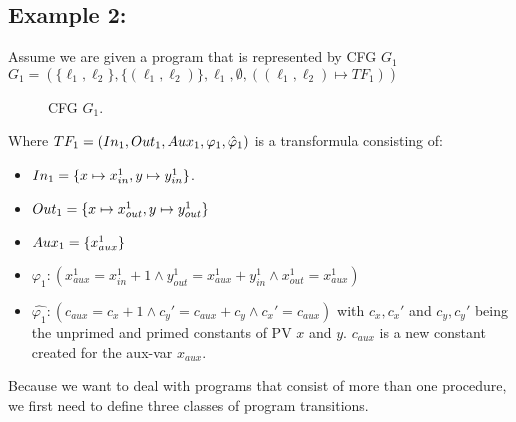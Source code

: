 \documentclass{article}
\newcommand\mycom[1]{}
\newcommand\mycom[1]{#1}
\newcommand{\jw}[1]{\mycom{\todo[color=blue!40,inline]{\small JW: #1}}}
\begin{document}
	\subsection*{Example 2:}
	Assume we are given a program that is represented by CFG $G_1$ \\ $G_1 = (\{ \ell_1, \ell_2 \}, \{ (\ell_1, \ell_2)\}, \ell_1, \emptyset, ((\ell_1, \ell_2) 
	\mapsto TF_1))$
	\begin{figure}[H]
		\centering
		\caption{CFG $G_1$.}
	\end{figure}

	Where $TF_1 = (In_1, Out_1, Aux_1, \varphi_1, \hat{\varphi}_1)$ is a transformula consisting of: 
	\begin{itemize}
		\item $In_1 = \{x \mapsto x_{in}^1, y \mapsto y_{in}^1 \}$.
		\item $Out_1 = \{ x \mapsto x_{out}^1, y \mapsto y_{out}^1 \}$
		\item $Aux_1 = \{x_{aux}^1 \} $
		\item $\varphi_1: (x_{aux}^1 = x_{in}^1 + 1 \land y_{out}^1 = x_{aux}^1 + y_{in}^1 \land x_{out}^1 = x_{aux}^1)$
		\item $\hat{\varphi_1}: (c_{aux} = c_x + 1 \land c_y' = c_{aux} + c_y \land c_x' = c_{aux})$ with $c_x, c_x'$ and $c_y, c_y'$ being the unprimed and primed constants of PV $x$ and $y$. $c_{aux}$ is a new constant created for the aux-var $x_{aux}$.
	\end{itemize}
	

	\bigskip\bigskip\bigskip\noindent
	Because we want to deal with programs that consist of more than one procedure, we first need to define three classes of program transitions.
	
	\jw{Fuse them together to show the renaming process.}
	
\end{document}
